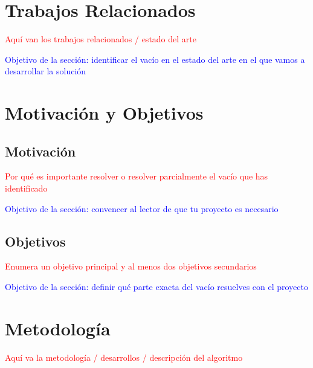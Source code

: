 \documentclass[12pt]{extarticle}
\numberwithin{equation}{section}
\begin{document}
\newpage

\section{Trabajos Relacionados}\label{sec:related} 
\textcolor{red}{Aqu\'i van los trabajos relacionados / estado del arte}

\textcolor{blue}{Objetivo de la secci\'on: identificar el vac\'io en el estado del arte en el que vamos a desarrollar la soluci\'on}

\newpage

\section{Motivaci\'on y Objetivos}

\subsection{Motivaci\'on}
\textcolor{red}{Por qu\'e es importante resolver o resolver parcialmente el vac\'io que has identificado}

\textcolor{blue}{Objetivo de la secci\'on: convencer al lector de que tu proyecto es necesario}

\subsection{Objetivos}
\textcolor{red}{Enumera un objetivo principal y al menos dos objetivos secundarios}

\textcolor{blue}{Objetivo de la secci\'on: definir qu\'e parte exacta del vac\'io resuelves con el proyecto}

\newpage

\section{Metodolog\'ia}\label{sec:methodology}
\textcolor{red}{Aqu\'i va la metodolog\'ia / desarrollos / descripci\'on del algoritmo}
\end{document}
